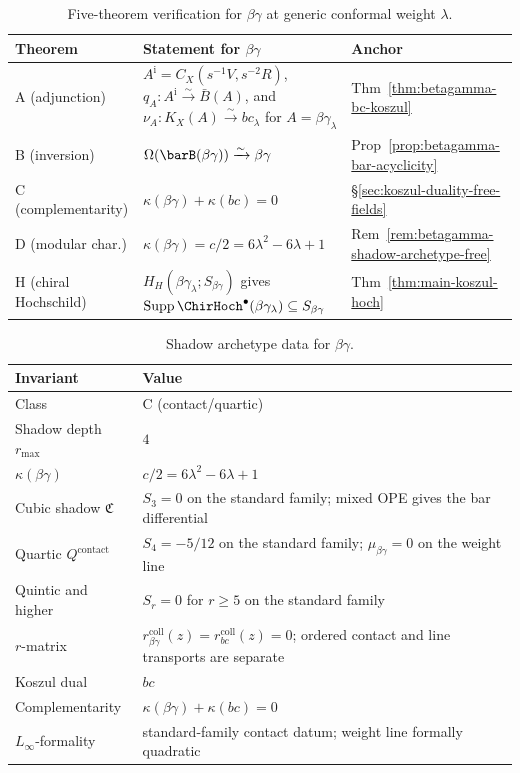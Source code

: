 \begin{table}[ht]
\centering
\small
\caption{Five-theorem verification for
$\beta\gamma$ at generic conformal weight
$\lambda$.}\label{tab:betagamma-five-theorems}
\begin{tabular}{lll}
\toprule
\textbf{Theorem} & \textbf{Statement for $\beta\gamma$}
 & \textbf{Anchor} \\
\midrule
A (adjunction) &
 $A^{\mathrm i}=C_X(s^{-1}V,s^{-2}R)$,
 $q_A\colon A^{\mathrm i}\xrightarrow{\sim}\bar B(A)$, and
 $\nu_A\colon K_X(A)\xrightarrow{\sim}bc_\lambda$
 for $A=\beta\gamma_\lambda$
 & Thm~\ref{thm:betagamma-bc-koszul} \\
B (inversion) &
 $\Omega(\barB(\beta\gamma)) \xrightarrow{\sim}
 \beta\gamma$
 & Prop~\ref{prop:betagamma-bar-acyclicity} \\
C (complementarity) &
 $\kappa(\beta\gamma) + \kappa(bc) = 0$
 & \S\ref{sec:koszul-duality-free-fields} \\
D (modular char.) &
 $\kappa(\beta\gamma)
 = c/2 = 6\lambda^2{-}6\lambda{+}1$
 & Rem~\ref{rem:betagamma-shadow-archetype-free} \\
H (chiral Hochschild) &
 $H_H(\beta\gamma_\lambda;S_{\beta\gamma})$ gives
 $\operatorname{Supp}\ChirHoch^\bullet(\beta\gamma_\lambda)
 \subseteq S_{\beta\gamma}$
 & Thm~\ref{thm:main-koszul-hoch} \\
\bottomrule
\end{tabular}
\end{table}

\begin{table}[ht]
\centering
\small
\caption{Shadow archetype data for
$\beta\gamma$.}\label{tab:betagamma-shadow-archetype}
\begin{tabular}{ll}
\toprule
\textbf{Invariant} & \textbf{Value} \\
\midrule
Class & C (contact/quartic) \\
Shadow depth $r_{\max}$ & $4$ \\
$\kappa(\beta\gamma)$ &
 $c/2 = 6\lambda^2 - 6\lambda + 1$ \\
Cubic shadow $\mathfrak{C}$ &
 $S_3=0$ on the standard family; mixed OPE gives the bar differential \\
Quartic $Q^{\mathrm{contact}}$ &
 $S_4=-5/12$ on the standard family; $\mu_{\beta\gamma}=0$ on the weight line \\
Quintic and higher & $S_r=0$ for $r\ge5$ on the standard family \\
$r$-matrix &
 $r^{\mathrm{coll}}_{\beta\gamma}(z)=r^{\mathrm{coll}}_{bc}(z)=0$;
 ordered contact and line transports are separate \\
Koszul dual & $bc$ \\
Complementarity & $\kappa(\beta\gamma) + \kappa(bc) = 0$ \\
$L_\infty$-formality &
 standard-family contact datum; weight line formally quadratic \\
\bottomrule
\end{tabular}
\end{table}

